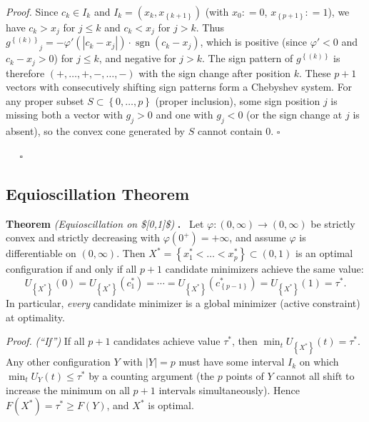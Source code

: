 \documentclass[
]{article}
\begin{document}
\emph{Proof.} Since \(c_{k} \in I_{k}\) and
\(I_{k} = \left( x_{k},x_{\left\{ k + 1 \right\}} \right)\) (with
\(x_{0}: = 0\), \(x_{\left\{ p + 1 \right\}}: = 1\)), we have
\(c_{k} > x_{j}\) for \(j \leq k\) and \(c_{k} < x_{j}\) for \(j > k\).
Thus
\({g^{\left\{ (k) \right\}}}_{j} = - \varphi\prime\left( \left| c_{k} - x_{j} \right| \right) \cdot \operatorname{sgn}(c_{k} - x_{j})\),
which is positive (since \(\varphi\prime < 0\) and
\(c_{k} - x_{j} > 0\)) for \(j \leq k\), and negative for \(j > k\). The
sign pattern of \(g^{\left\{ (k) \right\}}\) is therefore
\(( + ,\ldots, + , - ,\ldots, - )\) with the sign change after position
\(k\). These \(p + 1\) vectors with consecutively shifting sign patterns
form a Chebyshev system. For any proper subset
\(S \subset \left\{ 0,\ldots,p \right\}\) (proper inclusion), some sign
position \(j\) is missing both a vector with \(g_{j} > 0\) and one with
\(g_{j} < 0\) (or the sign change at \(j\) is absent), so the convex
cone generated by \(S\) cannot contain \(0\). \(\square\)

   \(\square\)

\subsection{Equioscillation Theorem}

\textbf{Theorem} \emph{(Equioscillation on \${[}0,1{]}\$)} \textbf{.} 
Let \(\varphi:(0,\infty) \rightarrow (0,\infty)\) be strictly convex and
strictly decreasing with \(\varphi(0^{+}) = + \infty\), and assume
\(\varphi\) is differentiable on \((0,\infty)\). Then
\(X^{*} = \left\{ x_{1}^{*} < \ldots < x_{p}^{*} \right\} \subset (0,1)\)
is an optimal configuration if and only if all \(p + 1\) candidate
minimizers achieve the same value:
\[U_{\left\{ X^{*} \right\}}(0) = U_{\left\{ X^{*} \right\}}\left( c_{1}^{*} \right) = \cdots = U_{\left\{ X^{*} \right\}}\left( c_{\left\{ p - 1 \right\}}^{*} \right) = U_{\left\{ X^{*} \right\}}(1) = \tau^{*}.\]
In particular, \emph{every} candidate minimizer is a global minimizer
(active constraint) at optimality.

\emph{Proof.} \emph{(``If'')} If all \(p + 1\) candidates achieve value
\(\tau^{*}\), then \(\min_{t}U_{\left\{ X^{*} \right\}}(t) = \tau^{*}\).
Any other configuration \(Y\) with \(|Y| = p\) must have some interval
\(I_{k}\) on which \(\min_{t}U_{Y}(t) \leq \tau^{*}\) by a counting
argument (the \(p\) points of \(Y\) cannot all shift to increase the
minimum on all \(p + 1\) intervals simultaneously). Hence
\(F\left( X^{*} \right) = \tau^{*} \geq F(Y)\), and \(X^{*}\) is
optimal.
\end{document}
